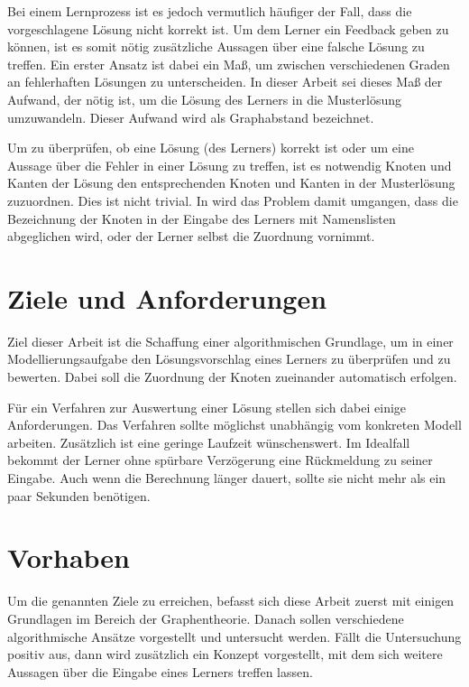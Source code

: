 Bei einem Lernprozess ist es jedoch vermutlich 
häufiger der Fall, dass die vorgeschlagene Lösung nicht 
korrekt ist. Um dem Lerner ein Feedback geben zu können, 
ist es somit nötig zusätzliche Aussagen über eine falsche 
Lösung zu treffen. Ein erster Ansatz ist dabei ein Maß, 
um zwischen verschiedenen Graden an fehlerhaften Lösungen 
zu unterscheiden. In dieser Arbeit sei dieses Maß der 
Aufwand, der nötig ist, um die Lösung des Lerners in die 
Musterlösung umzuwandeln. Dieser Aufwand wird als 
Graphabstand bezeichnet.

Um zu überprüfen, ob eine Lösung (des Lerners) korrekt ist 
oder um eine Aussage über die Fehler in einer Lösung zu 
treffen, ist es notwendig Knoten und Kanten der Lösung den 
entsprechenden Knoten und Kanten in der Musterlösung 
zuzuordnen. Dies ist nicht trivial. In \cite{Bravo:2006} 
wird das Problem damit umgangen, dass die Bezeichnung der 
Knoten in der Eingabe des Lerners mit Namenslisten abgeglichen 
wird, oder der Lerner selbst die Zuordnung vornimmt.

\section{Ziele und Anforderungen}
Ziel dieser Arbeit ist die Schaffung einer algorithmischen 
Grundlage, um in einer Modellierungsaufgabe den Lösungsvorschlag 
eines Lerners zu überprüfen und zu bewerten. Dabei soll die 
Zuordnung der Knoten zueinander automatisch erfolgen.

Für ein Verfahren zur Auswertung einer Lösung stellen sich 
dabei einige Anforderungen. Das Verfahren sollte möglichst 
unabhängig vom konkreten Modell arbeiten. Zusätzlich ist 
eine geringe Laufzeit wünschenswert. Im Idealfall bekommt 
der Lerner ohne spürbare Verzögerung eine Rückmeldung 
zu seiner Eingabe. Auch wenn die Berechnung länger dauert, 
sollte sie nicht mehr als ein paar Sekunden benötigen.

\section{Vorhaben}
Um die genannten Ziele zu erreichen, befasst sich diese Arbeit 
zuerst mit einigen Grundlagen im Bereich der Graphentheorie. 
Danach sollen verschiedene algorithmische Ansätze vorgestellt 
und untersucht werden. Fällt die Untersuchung positiv aus, dann 
wird zusätzlich ein Konzept vorgestellt, mit dem sich weitere 
Aussagen über die Eingabe eines Lerners treffen lassen.
